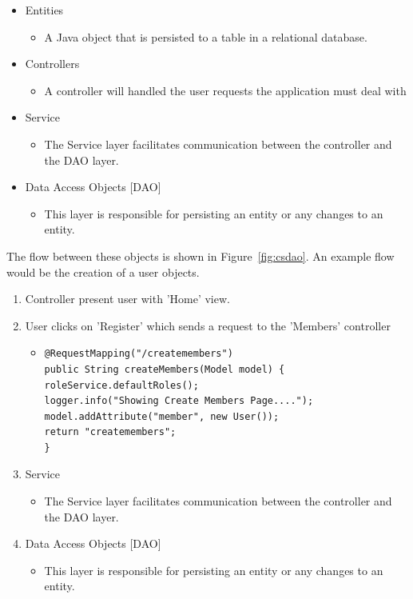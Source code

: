 \begin{table}[H]
\begin{itemize}
\item Entities
\begin{itemize}
\item A Java object that is persisted to a table in a relational database.
\end{itemize}
\item Controllers
\begin{itemize}
\item A controller will handled the user requests the application must deal with
\end{itemize}
\item Service
\begin{itemize}
\item The Service layer facilitates communication between the controller and the DAO layer.
\end{itemize}
\item Data Access Objects [DAO]
\begin{itemize}
\item This layer is responsible for persisting an entity or any changes to an entity.
\end{itemize}
\end{itemize}
\label{fig:appbreakdown}
\end{table}

The flow between these objects is shown in Figure~\ref{fig:csdao}. An example flow would be the creation of a user objects. 
\begin{table}[H]
\begin{enumerate}
\item Controller present user with 'Home' view.
\item User clicks on 'Register' which sends a request to the 'Members' controller
\begin{itemize}
\item
\begin{lstlisting}
@RequestMapping("/createmembers")
public String createMembers(Model model) {
roleService.defaultRoles();
logger.info("Showing Create Members Page....");
model.addAttribute("member", new User());
return "createmembers";
}
\end{lstlisting}
\end{itemize}
\item Service
\begin{itemize}
\item The Service layer facilitates communication between the controller and the DAO layer.
\end{itemize}
\item Data Access Objects [DAO]
\begin{itemize}
\item This layer is responsible for persisting an entity or any changes to an entity.
\end{itemize}
\end{enumerate}
\label{fig:appbreakdown}
\end{table}


